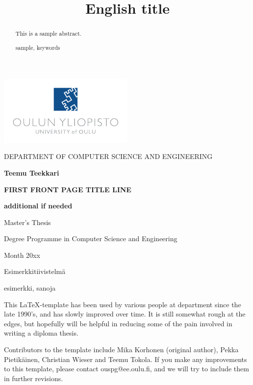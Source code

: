 \documentclass[a4paper, 12pt,titlepage]{dithesis}
\title{English title}
\begin{document}
\centerline{\includegraphics*[width=0.5\textwidth]{uni_logo}}
\centerline{{\small DEPARTMENT OF COMPUTER SCIENCE AND ENGINEERING}}

\vspace{65 mm}
\centerline{\textbf{\LARGE Teemu Teekkari }}
\vspace{15 mm}
\centerline{\textbf{\LARGE FIRST FRONT PAGE TITLE LINE}}
\centerline{\textbf{\LARGE additional if needed}}

\vspace{70 mm}
\centerline{\large {Master's Thesis}}
\centerline{\large {Degree Programme in Computer Science and Engineering}}
\centerline{\large {Month 20xx}}



\begin{abstract}
This is a sample abstract.

\keywords sample, keywords
\end{abstract}

\begin{tiivistelma}
Esimerkkitiivistelmä

\avainsanat esimerkki, sanoja
\end{tiivistelma}


\sisluettelo

This \LaTeX -template has been used by various people at department
since the late 1990's, and has slowly improved over time.  It is still
somewhat rough at the edges, but hopefully will be helpful in reducing
some of the pain involved in writing a diploma thesis.

Contributors to the template include Mika Korhonen (original author),
Pekka Pietikäinen, Christian Wieser and Teemu Tokola.  If you make any
improvements to this template, please contact ouspg@ee.oulu.fi, and we
will try to include them in further revisions.
\end{document}
